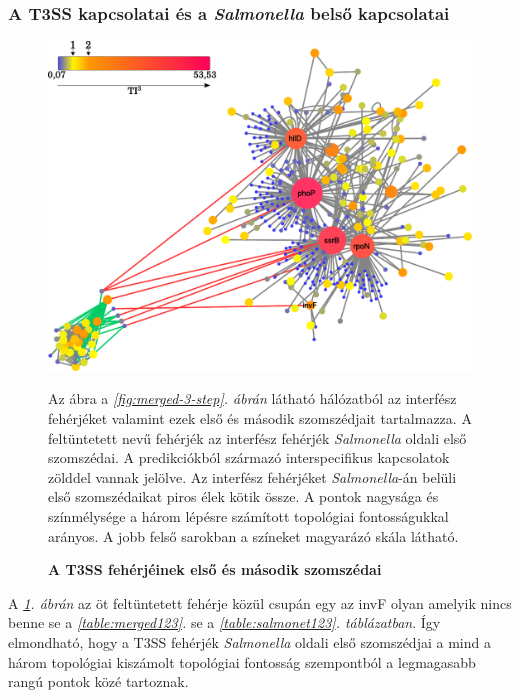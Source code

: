 \documentclass[a4paper,12pt]{article}
\newenvironment{imgdesc}{
		\small
		\singlespacing
		\begin{center}
		
	}{
		\end{center}	
	}
\begin{document}
		\subsubsection{A T3SS kapcsolatai és a \textit{Salmonella} belső kapcsolatai}
		
		\begin{figure}[H]
			\includegraphics[scale=0.6]{img/t3ss-inner-salmonella.pdf}
			\centering
			\caption{ \textbf{A T3SS fehérjéinek első és második szomszédai}}
			\begin{imgdesc}
				Az ábra a \textit{\ref{fig:merged-3-step}. ábrán} látható hálózatból az interfész fehérjéket valamint ezek első és második szomszédjait tartalmazza. A feltüntetett nevű fehérjék az interfész fehérjék \textit{Salmonella} oldali első szomszédai. A predikciókból származó interspecifikus kapcsolatok zölddel vannak jelölve. Az interfész fehérjéket \textit{Salmonella}-án belüli első szomszédaikat piros élek kötik össze. A pontok nagysága és színmélysége a három lépésre számított topológiai fontosságukkal arányos. A jobb felső sarokban a színeket magyarázó skála látható.
			\end{imgdesc}
			\label{fig:t3ss_inner}			 		 
		\end{figure}

		A \textit{\ref{fig:t3ss_inner}. ábrán} az öt feltüntetett fehérje közül csupán egy az invF olyan amelyik nincs benne se a \textit{\ref{table:merged123}.} se a \textit{\ref{table:salmonet123}. táblázatban}. Így elmondható, hogy a T3SS fehérjék \textit{Salmonella} oldali első szomszédjai a mind a három topológiai kiszámolt topológiai fontosság szempontból a legmagasabb rangú pontok közé tartoznak.
\end{document}
